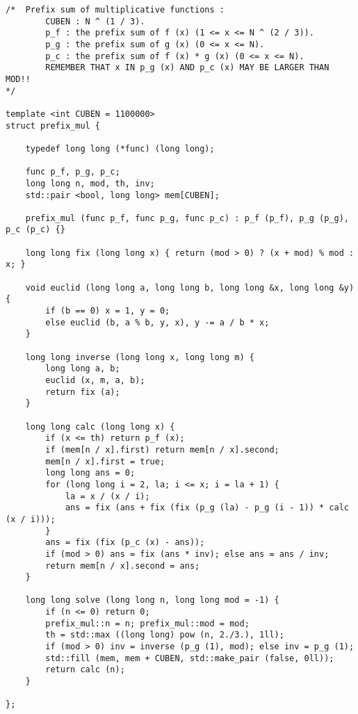 \begin{lstlisting}
/*	Prefix sum of multiplicative functions :
		CUBEN : N ^ (1 / 3).
		p_f : the prefix sum of f (x) (1 <= x <= N ^ (2 / 3)).
		p_g : the prefix sum of g (x) (0 <= x <= N).
		p_c : the prefix sum of f (x) * g (x) (0 <= x <= N).
		REMEMBER THAT x IN p_g (x) AND p_c (x) MAY BE LARGER THAN MOD!!
*/

template <int CUBEN = 1100000>
struct prefix_mul {

	typedef long long (*func) (long long);

	func p_f, p_g, p_c;
	long long n, mod, th, inv;
	std::pair <bool, long long> mem[CUBEN];

	prefix_mul (func p_f, func p_g, func p_c) : p_f (p_f), p_g (p_g), p_c (p_c) {}

	long long fix (long long x) { return (mod > 0) ? (x + mod) % mod : x; }

	void euclid (long long a, long long b, long long &x, long long &y) {
		if (b == 0) x = 1, y = 0;
		else euclid (b, a % b, y, x), y -= a / b * x;
	}

	long long inverse (long long x, long long m) {
		long long a, b;
		euclid (x, m, a, b);
		return fix (a);
	}

	long long calc (long long x) {
		if (x <= th) return p_f (x);
		if (mem[n / x].first) return mem[n / x].second;
		mem[n / x].first = true;
		long long ans = 0;
		for (long long i = 2, la; i <= x; i = la + 1) {
			la = x / (x / i);
			ans = fix (ans + fix (fix (p_g (la) - p_g (i - 1)) * calc (x / i)));
		}
		ans = fix (fix (p_c (x) - ans));
		if (mod > 0) ans = fix (ans * inv); else ans = ans / inv;
		return mem[n / x].second = ans;
	}

	long long solve (long long n, long long mod = -1) {
		if (n <= 0) return 0;
		prefix_mul::n = n; prefix_mul::mod = mod;
		th = std::max ((long long) pow (n, 2./3.), 1ll);
		if (mod > 0) inv = inverse (p_g (1), mod); else inv = p_g (1);
		std::fill (mem, mem + CUBEN, std::make_pair (false, 0ll));
		return calc (n); 
	}

};
\end{lstlisting}


